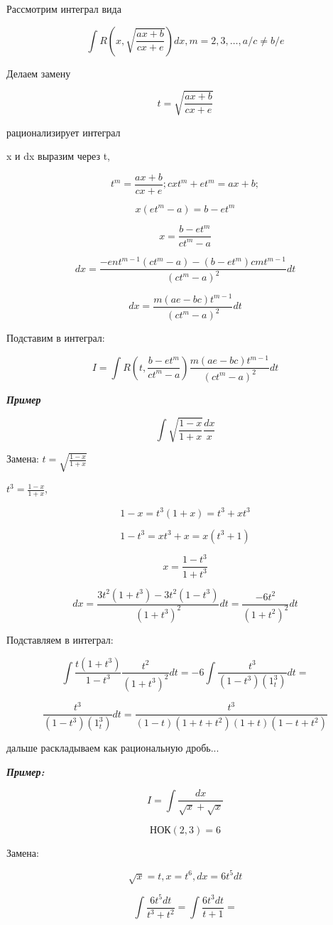 \documentclass[a4paper,12pt]{article}
\theoremstyle{plain} %
\theoremstyle{definition} %
\theoremstyle{remark} %
\begin{document}
Рассмотрим интеграл вида

\[
	\int R\left(x, \sqrt{\frac{ax + b}{cx + e}} \right) dx, m = 2, 3, \dots, a/c \neq b/e
\]

Делаем замену

\[
	t = \sqrt{\frac{ax + b}{cx + e}}
\]

рационализирует интеграл

x и dx выразим через t,

\[
	t^m = \frac{ax + b}{cx + e}; cxt^m + et^m = ax + b;
\]

\[
	x(et^m - a) = b - et^m
\]

\[
	x = \frac{b - et^m}{ct^m - a}
\]

\[
	dx = \frac{-ent^{m-1}(ct^m - a) - (b - et^m)cmt^{m-1}}{(ct^m  - a)^2} dt
\]

\[
	dx = \frac{m(ae - bc)t^{m-1}}{(ct^m - a)^2}dt
\]

Подставим в интеграл:

\[
	I = \int R(t, \frac{b - et^m}{ct^m - a}) \frac{m(ae - bc)t^{m-1}}{(ct^m - a)^2}dt
\]

\textit{\textbf{Пример}}

\[
	\int \sqrt{\frac{1 - x}{1 + x}} \frac{dx}{x}
\]

Замена: $t = \sqrt{\frac{1 - x}{1 + x}}$


$t^3 = \frac{1 - x}{1 + x}$,

\[
	1 - x = t^3(1 + x) = t^3 + xt^3
\]

\[
	1 - t^3 = xt^3 + x = x(t^3 + 1)
\]

\[ x = \frac{1 - t^3}{1 + t^3} \]

\[
	dx = \frac{3t^2(1 + t^3) - 3t^2(1 - t^3)}{(1 + t^3)^2} dt = \frac{-6t^2}{(1 + t^2)^2}dt
\]

Подставляем в интеграл:

\[
	\int \frac{t(1 + t^3)}{1 - t^3} \frac{t^2}{(1 + t^3)^2}dt = -6\int \frac{t^3}{(1 - t^3)(1 _ t^3)}dt =
\]

\[
	\frac{t^3}{(1 - t^3)(1 _ t^3)}dt = \frac{t^3}{(1 - t)(1 + t + t^2)(1 + t)(1 - t + t^2)}
\]

дальше раскладываем как рациональную дробь...

\textit{\textbf{Пример:}}

\[
	I = \int \frac{dx}{\sqrt{x} + \sqrt{x}}
\]

\[ \text{НОК}(2, 3) = 6 \]

Замена:

\[ \sqrt{x} = t, x = t^6, dx = 6t^5dt \]

\[
	\int \frac{6t^5dt}{t^3 + t^2} = \int \frac{6t^3dt}{t + 1}
	=
\]
\end{document}
